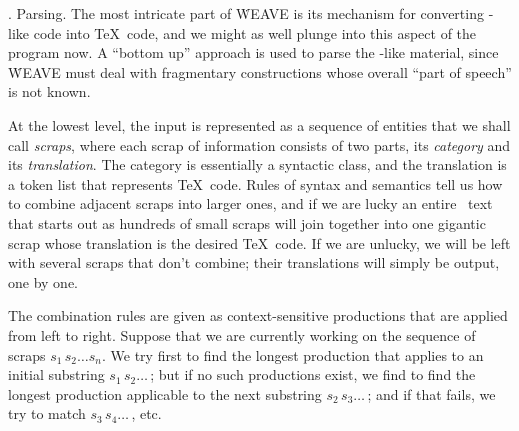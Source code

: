 .  Parsing.
The most intricate part of \.{WEAVE} is its mechanism for converting
\PASCAL-like code into \TeX\ code, and we might as well plunge into this
aspect of the program now. A ``bottom up'' approach is used to parse the
\PASCAL-like material, since \.{WEAVE} must deal with fragmentary
constructions whose overall ``part of speech'' is not known.

At the lowest level, the input is represented as a sequence of entities
that we shall call {\it scraps}, where each scrap of information consists
of two parts, its {\it category} and its {\it translation}. The category
is essentially a syntactic class, and the translation is a token list that
represents \TeX\ code. Rules of syntax and semantics tell us how to
combine adjacent scraps into larger ones, and if we are lucky an entire
\PASCAL\ text that starts out as hundreds of small scraps will join
together into one gigantic scrap whose translation is the desired \TeX\
code. If we are unlucky, we will be left with several scraps that don't
combine; their translations will simply be output, one by one.

The combination rules are given as context-sensitive productions that are
applied from left to right. Suppose that we are currently working on the
sequence of scraps $s_1\,s_2\ldots s_n$. We try first to find the longest
production that applies to an initial substring $s_1\,s_2\ldots\,$; but if
no such productions exist, we find to find the longest production
applicable to the next substring $s_2\,s_3\ldots\,$; and if that fails, we
try to match $s_3\,s_4\ldots\,$, etc.

